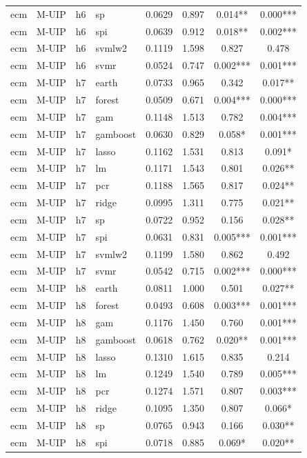 \begin{ThreePartTable}
\begin{longtable}[t]{llclcccc}
ecm & M-UIP & h6 & sp & 0.0629 & 0.897 & 0.014** & 0.000***\\
ecm & M-UIP & h6 & spi & 0.0639 & 0.912 & 0.018** & 0.002***\\
ecm & M-UIP & h6 & svmlw2 & 0.1119 & 1.598 & 0.827 & 0.478\\
ecm & M-UIP & h6 & svmr & 0.0524 & 0.747 & 0.002*** & 0.001***\\
\addlinespace
ecm & M-UIP & h7 & earth & 0.0733 & 0.965 & 0.342 & 0.017**\\
ecm & M-UIP & h7 & forest & 0.0509 & 0.671 & 0.004*** & 0.000***\\
ecm & M-UIP & h7 & gam & 0.1148 & 1.513 & 0.782 & 0.004***\\
ecm & M-UIP & h7 & gamboost & 0.0630 & 0.829 & 0.058* & 0.001***\\
ecm & M-UIP & h7 & lasso & 0.1162 & 1.531 & 0.813 & 0.091*\\
ecm & M-UIP & h7 & lm & 0.1171 & 1.543 & 0.801 & 0.026**\\
ecm & M-UIP & h7 & pcr & 0.1188 & 1.565 & 0.817 & 0.024**\\
ecm & M-UIP & h7 & ridge & 0.0995 & 1.311 & 0.775 & 0.021**\\
ecm & M-UIP & h7 & sp & 0.0722 & 0.952 & 0.156 & 0.028**\\
ecm & M-UIP & h7 & spi & 0.0631 & 0.831 & 0.005*** & 0.001***\\
ecm & M-UIP & h7 & svmlw2 & 0.1199 & 1.580 & 0.862 & 0.492\\
ecm & M-UIP & h7 & svmr & 0.0542 & 0.715 & 0.002*** & 0.000***\\
\addlinespace
ecm & M-UIP & h8 & earth & 0.0811 & 1.000 & 0.501 & 0.027**\\
ecm & M-UIP & h8 & forest & 0.0493 & 0.608 & 0.003*** & 0.001***\\
ecm & M-UIP & h8 & gam & 0.1176 & 1.450 & 0.760 & 0.001***\\
ecm & M-UIP & h8 & gamboost & 0.0618 & 0.762 & 0.020** & 0.001***\\
ecm & M-UIP & h8 & lasso & 0.1310 & 1.615 & 0.835 & 0.214\\
ecm & M-UIP & h8 & lm & 0.1249 & 1.540 & 0.789 & 0.005***\\
ecm & M-UIP & h8 & pcr & 0.1274 & 1.571 & 0.807 & 0.003***\\
ecm & M-UIP & h8 & ridge & 0.1095 & 1.350 & 0.807 & 0.066*\\
ecm & M-UIP & h8 & sp & 0.0765 & 0.943 & 0.166 & 0.030**\\
ecm & M-UIP & h8 & spi & 0.0718 & 0.885 & 0.069* & 0.020**\\

\end{longtable}
\end{ThreePartTable}
